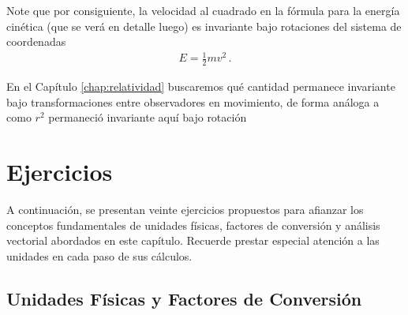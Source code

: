 \documentclass[11pt,a4paper]{book}
\begin{document}

Note que por consiguiente, la velocidad al cuadrado en la fórmula para la energía cinética (que se verá en detalle luego) es invariante bajo rotaciones del sistema de coordenadas
\begin{align*}
    E =\frac{1}{2}m v^2\,.
\end{align*}

En el Capítulo \ref{chap:relatividad} buscaremos qué cantidad permanece invariante bajo transformaciones entre observadores en movimiento, de forma análoga a como $r^2$ permaneció invariante aquí bajo rotación

\section{Ejercicios}

A continuación, se presentan veinte ejercicios propuestos para afianzar los conceptos fundamentales de unidades físicas, factores de conversión y análisis vectorial abordados en este capítulo. Recuerde prestar especial atención a las unidades en cada paso de sus cálculos.

\subsection*{Unidades Físicas y Factores de Conversión}
\end{document}
